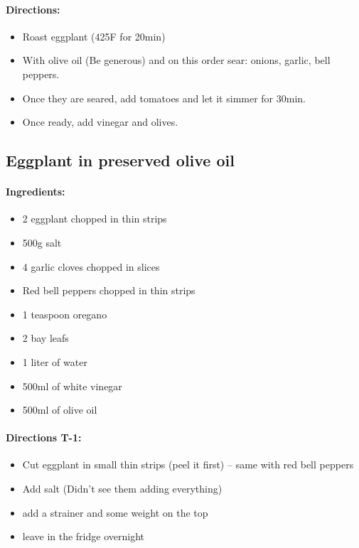 \documentclass{article}
\begin{document}
\paragraph{Directions:}
\begin{itemize}
	\item Roast eggplant (425F for 20min)
	\item With olive oil (Be generous) and on this order sear: onions, garlic, bell peppers.
	\item Once they are seared, add tomatoes and let it simmer for 30min.
	\item Once ready, add vinegar and olives.
\end{itemize}

\subsection{Eggplant in preserved olive oil}{}

\paragraph{Ingredients:}

\begin{itemize}
	\item 2 eggplant chopped in thin strips
	\item 500g salt
	\item 4 garlic cloves chopped in slices
	\item Red bell peppers chopped in thin strips
	\item 1 teaspoon oregano
	\item 2 bay leafs
	\item 1 liter of water
	\item 500ml of white vinegar
	\item 500ml of olive oil
\end{itemize}

\paragraph{Directions T-1:}
\begin{itemize}
	\item Cut eggplant in small thin strips (peel it first) -- same with red bell peppers
	\item Add salt (Didn't see them adding everything)
	\item add a strainer and some weight on the top
	\item leave in the fridge overnight
\end{itemize}
\end{document}
